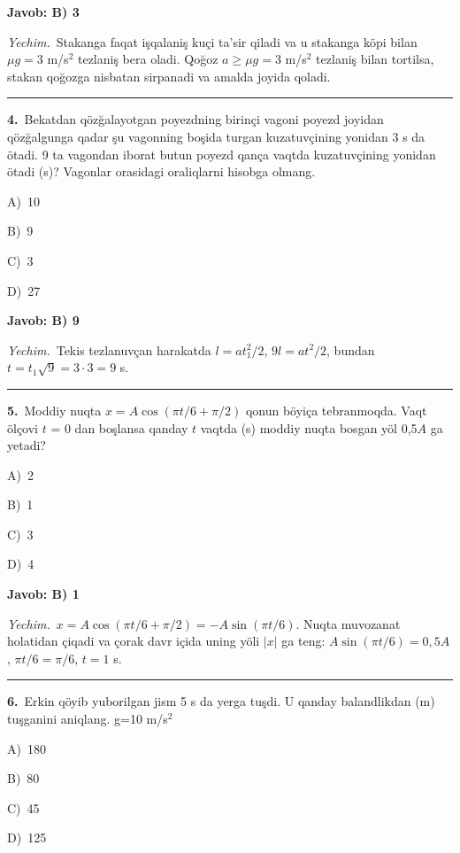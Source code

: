 \documentclass[11pt,a4paper]{article}
\newcommand{\opt}[2]{\hspace*{4mm}#1)\ #2\par}
\begin{document}
\noindent\colorbox{gray!12}{\parbox{\dimexpr\linewidth-2\fboxsep}{\textbf{Javob: B) 3}}}\par\smallskip
\noindent\textit{Yechim.}\ Stakanga faqat işqalaniş kuçi ta’sir qiladi va u stakanga köpi bilan $\mu g=3$ m/s$^2$ tezlaniş bera oladi. Qoğoz $a\ge\mu g=3$ m/s$^2$ tezlaniş bilan tortilsa, stakan qoğozga nisbatan sirpanadi va amalda joyida qoladi.\par\par\medskip\hrule\medskip
{}\noindent\begin{minipage}{\linewidth}
\textbf{4.}\ Bekatdan qözğalayotgan poyezdning birinçi vagoni poyezd joyidan qözğalgunga qadar şu vagonning boşida turgan kuzatuvçining yonidan 3 s da ötadi. 9 ta vagondan iborat butun poyezd qança vaqtda kuzatuvçining yonidan ötadi (s)? Vagonlar orasidagi oraliqlarni hisobga olmang.\par\smallskip
\opt{A}{10}
\opt{B}{9}
\opt{C}{3}
\opt{D}{27}
\end{minipage}\vspace{2pt}\par
\noindent\colorbox{gray!12}{\parbox{\dimexpr\linewidth-2\fboxsep}{\textbf{Javob: B) 9}}}\par\smallskip
\noindent\textit{Yechim.}\ Tekis tezlanuvçan harakatda $l=at_1^2/2$, $9l=at^2/2$, bundan $t=t_1\sqrt9=3\cdot3=9$ s.\par\par\medskip\hrule\medskip
{}\noindent\begin{minipage}{\linewidth}
\textbf{5.}\ Moddiy nuqta $x = A\cos(\pi t/6 + \pi/2)$ qonun böyiça tebranmoqda. Vaqt ölçovi $t$ = 0 dan boşlansa qanday $t$ vaqtda (s) moddiy nuqta bosgan yöl 0,5$A$ ga yetadi?\par\smallskip
\opt{A}{2}
\opt{B}{1}
\opt{C}{3}
\opt{D}{4}
\end{minipage}\vspace{2pt}\par
\noindent\colorbox{gray!12}{\parbox{\dimexpr\linewidth-2\fboxsep}{\textbf{Javob: B) 1}}}\par\smallskip
\noindent\textit{Yechim.}\ $x=A\cos(\pi t/6+\pi/2)=-A\sin(\pi t/6)$. Nuqta muvozanat holatidan çiqadi va çorak davr içida uning yöli $|x|$ ga teng: $A\sin(\pi t/6)=0{,}5A$, $\pi t/6=\pi/6$, $t=1$ s.\par\par\medskip\hrule\medskip
{}\noindent\begin{minipage}{\linewidth}
\textbf{6.}\ Erkin qöyib yuborilgan jism 5 s da yerga tuşdi. U qanday balandlikdan (m) tuşganini aniqlang. g=10 m/s$^{2}$\par\smallskip
\opt{A}{180}
\opt{B}{80}
\opt{C}{45}
\opt{D}{125}
\end{minipage}\vspace{2pt}\par
\end{document}
